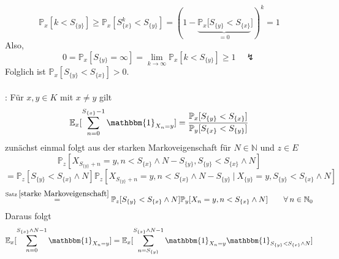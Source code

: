 \begin{itemize}
\begin{equation*}
\mathbb{P}_{x}[k < S_{\lbrace y \rbrace}] \geq \mathbb{P}_{x}[S_{\lbrace x \rbrace}^{k} < S_{\lbrace y \rbrace}] = \left( 1 - \underbrace{\mathbb{P}_{x}[S_{\lbrace y \rbrace} < S_{\lbrace x \rbrace}}_{=0}] \right)^{k} = 1
\end{equation*}
Also,
\begin{equation*}
0 = \mathbb{P}_{x}[S_{\lbrace y \rbrace} = \infty] = \lim_{k \to \infty} \mathbb{P}_{x}[k < S_{\lbrace y \rbrace}] \geq 1 \quad \lightning
\end{equation*}
Folglich ist $\mathbb{P}_{x}[S_{\lbrace y \rbrace} < S_{\lbrace x \rbrace}]>0.$
\\
\\
: Für $x,y \in K$ mit $x \neq y$ gilt 
\begin{equation*}
\mathbb{E}_{x}[\sum_{n=0}^{S_{\lbrace x \rbrace}-1} \mathbbm{1}_{X_{n} = y}] = \dfrac{\mathbb{P}_{x}[S_{\lbrace y \rbrace } < S_{\lbrace x \rbrace}]}{\mathbb{P}_{y}[S_{\lbrace x \rbrace } < S_{\lbrace y \rbrace}]}
\end{equation*}
zunächst einmal folgt aus der starken Markoveigenschaft für $N \in \mathbb{N}$ und $z \in E$
\begin{equation*}
\mathbb{P}_{z}[X_{S_{\lbrace y \rbrace} + n} = y, n < S_{\lbrace x \rbrace} \wedge N - S_{\lbrace y \rbrace}, S_{\lbrace y \rbrace} < S_{\lbrace x \rbrace} \wedge N]
\end{equation*}
\begin{equation*}
= \mathbb{P}_{z}[S_{\lbrace y \rbrace} < S_{\lbrace x \rbrace} \wedge N] \mathbb{P}_{z}[X_{S_{\lbrace y \rbrace} + n} = y, n < S_{\lbrace x \rbrace} \wedge N - S_{\lbrace y \rbrace} \: | \: X_{\lbrace y \rbrace} = y,S_{\lbrace y \rbrace} < S_{\lbrace x \rbrace} \wedge N]
\end{equation*}
\begin{equation*}
\stackrel{\mathrm{Satz \: \ref{starke Markoveigenschaft}}}{=} \mathbb{P}_{z}[S_{\lbrace y \rbrace} < S_{\lbrace x \rbrace} \wedge N] \mathbb{P}_{y}[X_{n} = y, n < S_{\lbrace x \rbrace} \wedge N] \qquad \forall \: n \in \mathbb{N}_{0}
\end{equation*}
Daraus folgt
\begin{equation*}
\mathbb{E}_{x}[\sum_{n=0}^{S_{\lbrace x \rbrace} \wedge N -1}  \mathbbm{1}_{X_{n} = y}] = \mathbb{E}_{x}[\sum_{n=S_{\lbrace y \rbrace}}^{S_{\lbrace x \rbrace} \wedge N -1}  \mathbbm{1}_{X_{n} = y} \mathbbm{1}_{S_{\lbrace y \rbrace} < S_{\lbrace x \rbrace} \wedge N}]
\end{equation*}

\end{itemize}
